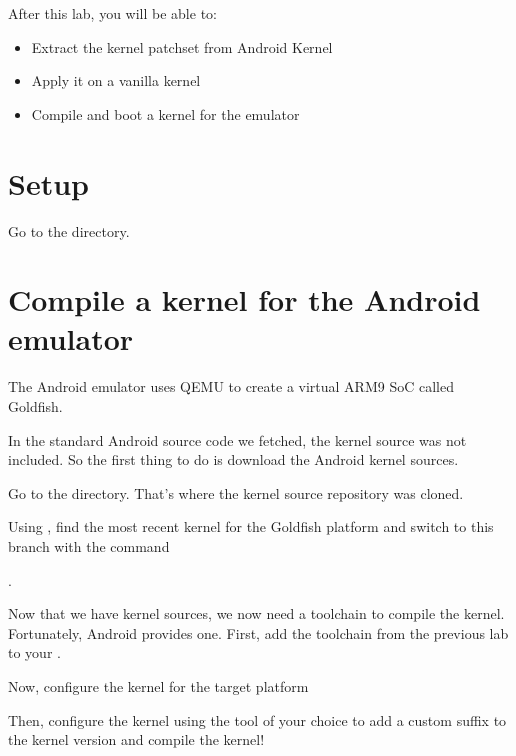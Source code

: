 
After this lab, you will be able to:
\begin{itemize}
  \item Extract the kernel patchset from Android Kernel
  \item Apply it on a vanilla kernel
  \item Compile and boot a kernel for the emulator
\end{itemize}

\section{Setup}

Go to the  directory.

\section{Compile a kernel for the Android emulator}

The Android emulator uses QEMU to create a virtual ARM9 SoC called Goldfish.

In the standard Android source code we fetched, the kernel source was not included.
So the first thing to do is download the Android kernel sources.


Go to the  directory. That's where the kernel source repository
was cloned.

Using , find the most recent kernel for the Goldfish platform
and switch to this branch with the command 

.

Now that we have kernel sources, we now need a toolchain to compile the kernel. Fortunately,
Android provides one. First, add the toolchain from the previous lab to your .


Now, configure the kernel for the target platform


Then, configure the kernel using the tool of your choice to add a custom suffix
to the kernel version and compile the kernel!

